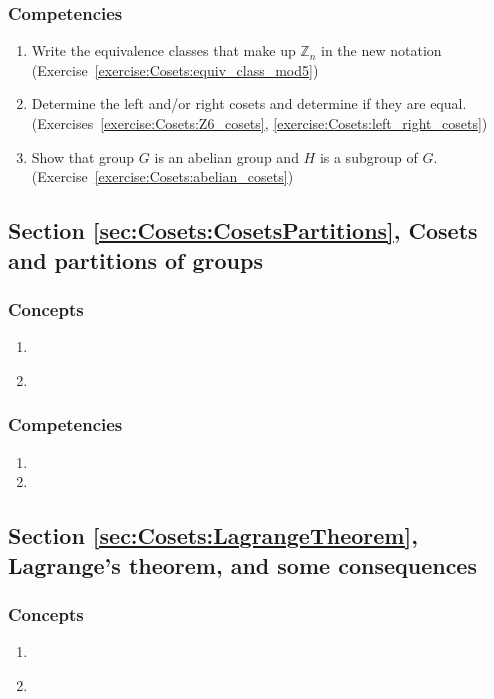 \subsubsection*{Competencies}
\begin{enumerate}
\item
Write the equivalence classes that make up ${\mathbb Z}_n$ in the new notation (Exercise~\ref{exercise:Cosets:equiv_class_mod5})
\item
Determine the left and/or right cosets and determine if they are equal. (Exercises~\ref{exercise:Cosets:Z6_cosets}, \ref{exercise:Cosets:left_right_cosets})
\item
Show that group $G$ is an abelian group and $H$ is a subgroup of $G$. (Exercise~\ref{exercise:Cosets:abelian_cosets})
\end{enumerate}


\subsection*{Section \ref{sec:Cosets:CosetsPartitions}, Cosets and partitions of groups}
\subsubsection*{Concepts}
\begin{enumerate}
\item 
\
\
\
\item
\end{enumerate}

\subsubsection*{Competencies}
\begin{enumerate}
\item
\item
\end{enumerate}


\subsection*{Section \ref{sec:Cosets:LagrangeTheorem}, Lagrange's theorem, and some consequences}
\subsubsection*{Concepts}
\begin{enumerate}
\item 
\
\
\
\item
\end{enumerate}

